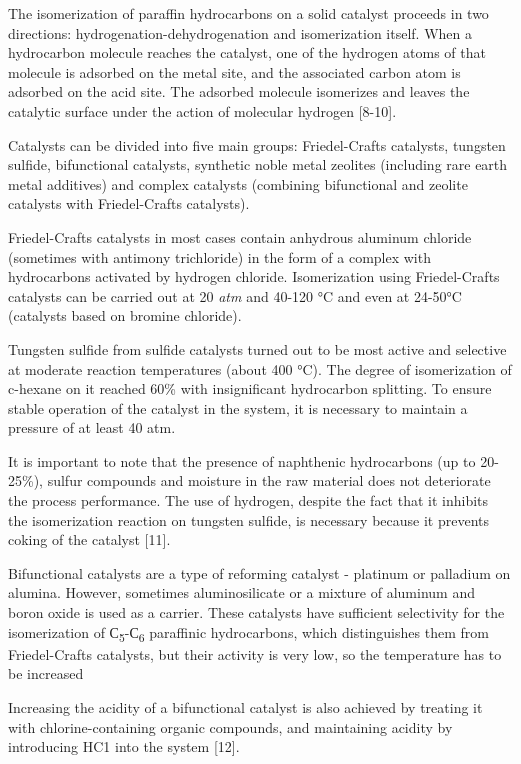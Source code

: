 The isomerization of paraffin hydrocarbons on a solid catalyst proceeds
in two directions: hydrogenation-dehydrogenation and isomerization
itself. When a hydrocarbon molecule reaches the catalyst, one of the
hydrogen atoms of that molecule is adsorbed on the metal site, and the
associated carbon atom is adsorbed on the acid site. The adsorbed
molecule isomerizes and leaves the catalytic surface under the action of
molecular hydrogen {[}8-10{]}.

Catalysts can be divided into five main groups: Friedel-Crafts
catalysts, tungsten sulfide, bifunctional catalysts, synthetic noble
metal zeolites (including rare earth metal additives) and complex
catalysts (combining bifunctional and zeolite catalysts with
Friedel-Crafts catalysts).

Friedel-Crafts catalysts in most cases contain anhydrous aluminum
chloride (sometimes with antimony trichloride) in the form of a complex
with hydrocarbons activated by hydrogen chloride. Isomerization using
Friedel-Crafts catalysts can be carried out at 20 \emph{atm} and 40-120
°C and even at 24-50°C (catalysts based on bromine chloride).

Tungsten sulfide from sulfide catalysts turned out to be most active and
selective at moderate reaction temperatures (about 400 °C). The degree
of isomerization of c-hexane on it reached 60\% with insignificant
hydrocarbon splitting. To ensure stable operation of the catalyst in the
system, it is necessary to maintain a pressure of at least 40 atm.

It is important to note that the presence of naphthenic hydrocarbons (up
to 20-25\%), sulfur compounds and moisture in the raw material does not
deteriorate the process performance. The use of hydrogen, despite the
fact that it inhibits the isomerization reaction on tungsten sulfide, is
necessary because it prevents coking of the catalyst {[}11{]}.

Bifunctional catalysts are a type of reforming catalyst - platinum or
palladium on alumina. However, sometimes aluminosilicate or a mixture of
aluminum and boron oxide is used as a carrier. These catalysts have
sufficient selectivity for the isomerization of
С\textsubscript{5}-С\textsubscript{6} paraffinic hydrocarbons, which
distinguishes them from Friedel-Crafts catalysts, but their activity is
very low, so the temperature has to be increased

Increasing the acidity of a bifunctional catalyst is also achieved by
treating it with chlorine-containing organic compounds, and maintaining
acidity by introducing HC1 into the system {[}12{]}.

